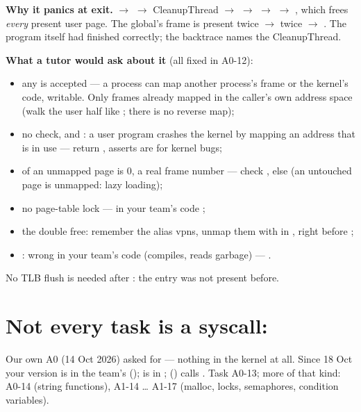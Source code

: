 \textbf{Why it panics at exit.}  $\to$  $\to$ CleanupThread $\to$
 $\to$  $\to$  $\to$
, which frees \emph{every} present user page. The global's frame is
present twice $\to$  twice $\to$ . The program
itself had finished correctly; the backtrace names the CleanupThread.

\textbf{What a tutor would ask about it} (all fixed in A0-12):
\begin{itemize}
\item any  is accepted --- a process can map another process's frame or the kernel's
  code, writable. Only frames already mapped in the caller's own address space (walk the user
  half like ; there is no reverse map);
\item no  check, and : a user program crashes the kernel by
  mapping an address that is in use --- return , asserts are for kernel bugs;
\item {} of an unmapped page is 0, a real frame number --- check
  , else  (an untouched page is unmapped: lazy loading);
\item no page-table lock --- in your team's code ;
\item the double free: remember the alias vpns, unmap them with  in
  , right before ;
\item {}: wrong in your team's code (compiles, reads garbage) ---
  .
\end{itemize}
No TLB flush is needed after : the entry was not present before.

\section{Not every task is a syscall: }
\label{sec:atexit}

Our own A0 (14 Oct 2026) asked for  --- nothing in the kernel at all. Since 18 Oct
your version is in the team's  ();  is in ; 
() calls . Task A0-13; more of that kind: A0-14 (string
functions), A1-14 \ldots{} A1-17 (malloc, locks, semaphores, condition variables).

